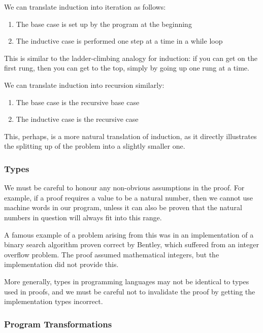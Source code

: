 We can translate induction into iteration as follows:

\begin{enumerate}
  \item The base case is set up by the program at the beginning
  \item The inductive case is performed one step at a time in a while
    loop
\end{enumerate}

This is similar to the ladder-climbing analogy for induction: if you
can get on the first rung, then you can get to the top, simply by
going up one rung at a time.

We can translate induction into recursion similarly:

\begin{enumerate}
  \item The base case is the recursive base case
  \item The inductive case is the recursive case
\end{enumerate}

This, perhaps, is a more natural translation of induction, as it
directly illustrates the splitting up of the problem into a slightly
smaller one.

\subsubsection{Types}
\label{sec:lit-verification-extraction-types}

We must be careful to honour any non-obvious assumptions in the
proof. For example, if a proof requires a value to be a natural
number, then we cannot use machine words in our program, unless it can
also be proven that the natural numbers in question will always fit
into this range.

A famous example of a problem arising from this was in an
implementation of a binary search algorithm proven correct by
Bentley\cite{Bentley86}, which suffered from an integer overflow
problem. The proof assumed mathematical integers, but the
implementation did not provide this.

More generally, types in programming languages may not be identical to
types used in proofs, and we must be careful not to invalidate the
proof by getting the implementation types incorrect.

\subsubsection{Program Transformations}
\label{sec:lit-verification-extraction-transformation}

